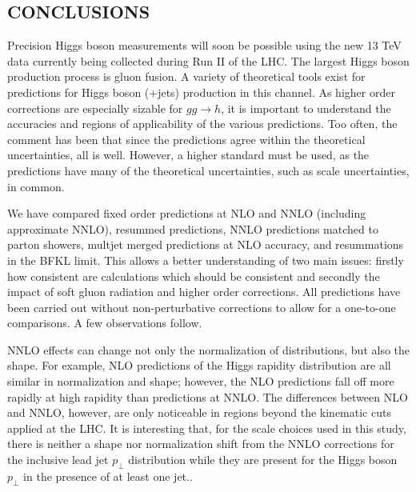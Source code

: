 \subsection{CONCLUSIONS}
\label{sec:hjetscomp:conclusions}

Precision Higgs boson measurements will soon be possible using the new
13 TeV data currently being collected during Run II of the LHC.
The largest Higgs boson production process is gluon fusion. A variety of theoretical 
tools exist for predictions for Higgs boson (+jets) production in this 
channel. As higher order corrections are especially sizable for $gg\to h$, 
it is important to understand the accuracies and regions of applicability 
of the various predictions. Too often, the comment has been that since 
the predictions agree within the theoretical uncertainties, all is well. 
However, a higher standard must be used, as the predictions have many of 
the theoretical uncertainties, such as scale uncertainties, in common. 

We have compared fixed order predictions at NLO and NNLO (including 
approximate NNLO), resummed predictions, NNLO predictions matched to parton 
showers, multjet merged predictions at NLO accuracy, and resummations 
in the BFKL limit. This allows a better understanding of two main issues: firstly how 
consistent are calculations which should be consistent and secondly the impact 
of soft gluon radiation and higher order corrections. All predictions have 
been carried out without non-perturbative corrections to allow for a one-to-one 
comparisons. A few observations follow. 

NNLO effects can change not only the normalization of distributions, but 
also the shape. For example, NLO predictions of the Higgs rapidity 
distribution are all similar in normalization and shape; however, the 
NLO predictions fall off more rapidly at high rapidity than predictions 
at NNLO. The differences between NLO and NNLO, however, are only 
noticeable in regions beyond the kinematic cuts applied at the LHC. It is 
interesting that, for the scale choices used in this study, there is 
neither a shape nor normalization shift from the NNLO corrections for the 
inclusive lead jet $p_\perp$ distribution while they are present for 
the Higgs boson $p_\perp$ in the presence of at least one jet.. 

